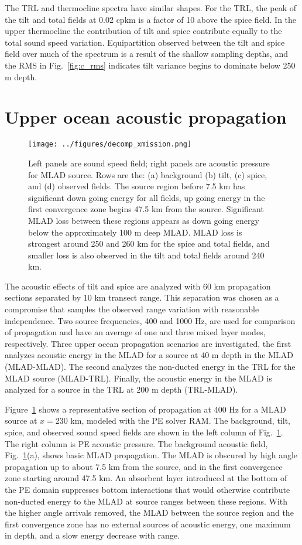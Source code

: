 \documentclass[preprint,NumberedRefs]{JASA}
\begin{document}
The TRL and thermocline spectra have similar shapes. For the TRL, the peak of the tilt and total fields at 0.02 cpkm is a factor of 10 above the spice field. In the upper thermocline the contribution of tilt and spice contribute equally to the total sound speed variation. Equipartition observed between the tilt and spice field over much of the spectrum is a result of the shallow sampling depths, and the RMS in Fig.~\ref{fig:c_rms} indicates tilt variance begins to dominate below 250 m depth.

\section{\label{sec:propagation}Upper ocean acoustic propagation}
\begin{figure}
\texttt{[image: ../figures/decomp\_xmission.png]}
    \caption{\label{fig:decomp_x}{Left panels are sound speed field; right panels are acoustic pressure for MLAD source. Rows are the: (a) background (b) tilt, (c) spice, and (d) observed fields. The source region before 7.5 km has significant down going energy for all fields, up going energy in the first convergence zone begins 47.5 km from the source. Significant MLAD loss between these regions appears as down going energy below the approximately 100 m deep MLAD. MLAD loss is strongest around 250 and 260 km for the spice and total fields, and smaller loss is also observed in the tilt and total fields around 240 km.}}
\end{figure}

The acoustic effects of tilt and spice are analyzed with 60 km propagation sections separated by 10 km transect range. This separation was chosen as a compromise that samples the observed range variation with reasonable independence. Two source frequencies, 400 and 1000 Hz, are used for comparison of propagation and have an average of one and three mixed layer modes, respectively. Three upper ocean propagation scenarios are investigated, the first analyzes acoustic energy in the MLAD for a source at 40 m depth in the MLAD (MLAD-MLAD). The second analyzes the non-ducted energy in the TRL for the MLAD source (MLAD-TRL). Finally, the acoustic energy in the MLAD is analyzed for a source in the TRL at 200 m depth (TRL-MLAD).

Figure~\ref{fig:decomp_x} shows a representative section of propagation at 400 Hz for a MLAD source at $x=$230 km, modeled with the PE solver RAM.\citep{collins93} The background, tilt, spice, and observed sound speed fields are shown in the left column of Fig.~\ref{fig:decomp_x}. The right column is PE acoustic pressure. The background acoustic field, Fig.~\ref{fig:decomp_x}(a), shows basic MLAD propagation. The MLAD is obscured by high angle propagation up to about 7.5 km from the source, and in the first convergence zone starting around 47.5 km. An absorbent layer introduced at the bottom of the PE domain suppresses bottom interactions that would otherwise contribute non-ducted energy to the MLAD at source ranges between these regions. With the higher angle arrivals removed, the MLAD between the source region and the first convergence zone has no external sources of acoustic energy, one maximum in depth, and a slow energy decrease with range.
\end{document}
